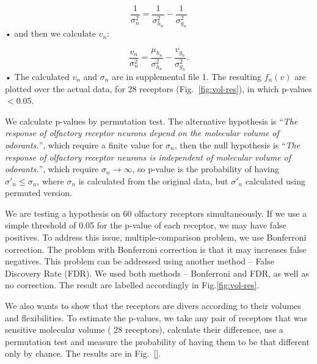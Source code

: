 \documentclass[11pt]{article} %
\newcommand{\numberofreceptors}{ 28 }
\begin{document}
\begin{equation}
	\frac{1}{\sigma_n^2} = \frac{1}{\sigma^2_{h_n}}  - \frac{1}{\sigma^2_{g_n}}
\end{equation}•
and then we calculate $v_n$: 

\begin{equation}
	\frac{v_n}{\sigma_n^2}  =    \frac{\mu_{h_n}}{\sigma^2_{h_n}} - \frac{v_{g_n}}{\sigma^2_{g_n}}.
\end{equation}•
The calculated $v_n$ and $\sigma_n$ are in supplemental file 1. 
The resulting $f_n(v)$ are plotted over the actual data, for \numberofreceptors receptors (Fig.~\ref{fig:vol-res}),
in which p-values $<0.05$. 

We calculate p-values by permutation test. 
The alternative hypothesis is 
``{\it The response of olfactory receptor neurons depend on the molecular volume of odorants.}'', 
which require  a finite value for $\sigma_n$, 
then the null hypothesis is 
``{\it The response of olfactory receptor neurons is independent of molecular volume of odorants.}'',
which require $\sigma_n \rightarrow \infty$, 
so p-value is the probability of having $\sigma'_n\leq\sigma_n$, 
where $\sigma_n$ is calculated from the original data, but $\sigma'_n$ calculated using permuted version.

We are testing a hypothesis on 60  olfactory receptors simultaneously. 
If we use a simple threshold of 0.05 for the p-value of each receptor, we may have false positives. 
To address this issue, multiple-comparison problem, 
we use Bonferroni correction. 
The problem with Bonferroni correction is that it may increases false negatives.
This problem can be addressed using another method -- False Discovery Rate (FDR).
We used both methods -- Bonferroni and FDR, as well as no correction. 
The result are labelled accordingly in Fig.\ref{fig:vol-res}.

We also wants to show that the receptors are divers according to their volumes and flexibilities. 
To estimate the p-values, 
we take any pair of receptors that was sensitive molecular volume (\numberofreceptors receptors),
calculate their difference, 
use a permutation test and measure the probability of having them to be that different only by chance.
The results are in Fig.~\ref{}.

\end{document}
